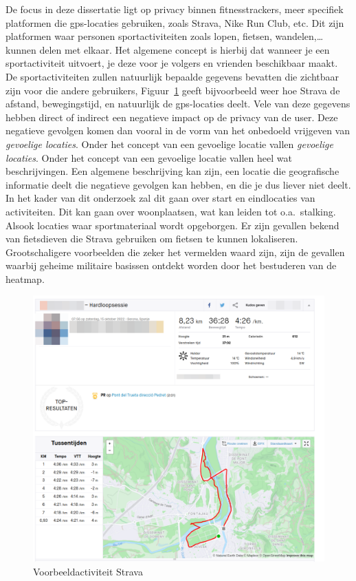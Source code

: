 De focus in deze dissertatie ligt op privacy binnen fitnesstrackers, meer
specifiek platformen die \ac{gps}-locaties gebruiken, zoals Strava, Nike Run
Club, etc. Dit zijn platformen waar personen sportactiviteiten zoals lopen,
fietsen, wandelen,\ldots kunnen delen met elkaar. Het algemene concept is
hierbij dat wanneer je een sportactiviteit uitvoert, je deze voor je volgers en
vrienden beschikbaar maakt. De sportactiviteiten zullen natuurlijk bepaalde
gegevens bevatten die zichtbaar zijn voor die andere gebruikers,
Figuur~\ref{fig:activityExample} geeft bijvoorbeeld weer hoe Strava de afstand,
bewegingstijd, en natuurlijk de \ac{gps}-locaties deelt. Vele van deze gegevens
hebben direct of indirect een negatieve impact op de privacy van de user. Deze
negatieve gevolgen komen dan vooral in de vorm van het onbedoeld vrijgeven van
\textit{gevoelige locaties}. Onder het concept van een gevoelige locatie vallen
\textit{gevoelige locaties}. Onder het concept van een gevoelige locatie vallen
heel wat beschrijvingen. Een algemene beschrijving kan zijn, een locatie die
geografische informatie deelt die negatieve gevolgen kan hebben, en die je dus
liever niet deelt. In het kader van dit onderzoek zal dit gaan over start en
eindlocaties van activiteiten. Dit kan gaan over woonplaatsen, wat kan leiden
tot o.a.\ stalking. Alsook locaties waar sportmateriaal wordt opgeborgen. Er
zijn gevallen bekend van fietsdieven die Strava gebruiken om fietsen te kunnen
lokaliseren\cite{Sportapp72:online}\cite{Cyclistw89:online}. Grootschaligere
voorbeelden die zeker het vermelden waard zijn, zijn de gevallen waarbij
geheime militaire basissen ontdekt worden door het bestuderen van de
heatmap\cite{Fitnesst33:online}.
\begin{figure}
    \centering
    \includegraphics[width=0.5\linewidth]{fig/VoorbeeldActiviteiten/VoorbeeldActiviteit_Cropped.png}
    \caption{Voorbeeldactiviteit Strava}\label{fig:activityExample}
\end{figure}

